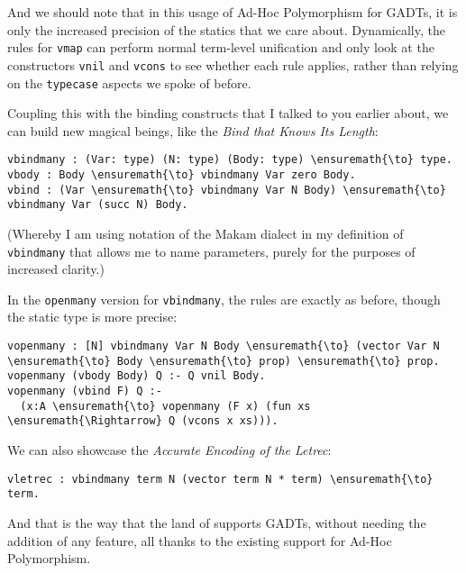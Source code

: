 And we should note that in this usage of Ad-Hoc Polymorphism for GADTs,
it is only the increased precision of the statics that we care about.
Dynamically, the rules for \texttt{vmap} can perform normal term-level
unification and only look at the constructors \texttt{vnil} and
\texttt{vcons} to see whether each rule applies, rather than relying on
the \texttt{typecase} aspects we spoke of before.

Coupling this with the binding constructs that I talked to you earlier
about, we can build new magical beings, like the \emph{Bind that Knows
Its Length}:

\begin{verbatim}
vbindmany : (Var: type) (N: type) (Body: type) \ensuremath{\to} type.
vbody : Body \ensuremath{\to} vbindmany Var zero Body.
vbind : (Var \ensuremath{\to} vbindmany Var N Body) \ensuremath{\to} vbindmany Var (succ N) Body.
\end{verbatim}

(Whereby I am using notation of the Makam dialect in my definition of
\texttt{vbindmany} that allows me to name parameters, purely for the
purposes of increased clarity.)

In the \texttt{openmany} version for \texttt{vbindmany}, the rules are
exactly as before, though the static type is more precise:

\begin{verbatim}
vopenmany : [N] vbindmany Var N Body \ensuremath{\to} (vector Var N \ensuremath{\to} Body \ensuremath{\to} prop) \ensuremath{\to} prop.
vopenmany (vbody Body) Q :- Q vnil Body.
vopenmany (vbind F) Q :-
  (x:A \ensuremath{\to} vopenmany (F x) (fun xs \ensuremath{\Rightarrow} Q (vcons x xs))).
\end{verbatim}

We can also showcase the \emph{Accurate Encoding of the Letrec}:

\begin{verbatim}
vletrec : vbindmany term N (vector term N * term) \ensuremath{\to} term.
\end{verbatim}

And that is the way that the land of \lamprolog supports GADTs, without
needing the addition of any feature, all thanks to the existing support
for Ad-Hoc Polymorphism.

\identDialog
